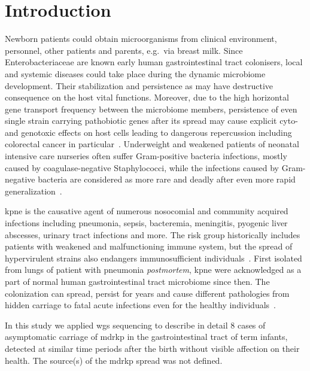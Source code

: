 \section{Introduction}\label{sec:intro}
Newborn patients could obtain microorganisms from clinical environment, personnel, other patients and parents,
e.g.\ via breast milk.
Since Enterobacteriaceae are known early human gastrointestinal tract colonisers, local and systemic diseases could take
place during the dynamic microbiome development.
Their stabilization and persistence as may have destructive consequence on the host vital functions.
Moreover, due to the high horizontal gene transport frequency between the microbiome members, persistence of even single
strain carrying pathobiotic genes after its spread may cause explicit cyto- and genotoxic effects on host cells
leading to dangerous repercussion including colorectal cancer in particular~\cite{Pope2019}.
Underweight and weakened patients of neonatal intensive care nurseries often suffer Gram-positive bacteria infections,
mostly caused by coagulase-negative Staphylococci, while the infections caused by Gram-negative bacteria are considered
as more rare and deadly after even more rapid generalization~\cite{Dorota2017}.

\gls{kpne} is the causative agent of numerous nosocomial and community acquired infections including
pneumonia, sepsis, bacteremia, meningitis, pyogenic liver abscesses, urinary tract infections and more.
The risk group historically includes patients with weakened and malfunctioning immune system, but the spread of
hypervirulent strains also endangers immunosufficient individuals~\cite{Shankar2018}.
First isolated from lungs of patient with pneumonia \textit{postmortem}, \gls{kpne} were acknowledged as a part of
normal human gastrointestinal tract microbiome since then.
The colonization can spread, persist for years and cause different pathologies from hidden carriage to
fatal acute infections even for the healthy individuals~\cite{Martin2018}.

In this study we applied \gls{wgs} sequencing to describe in detail 8 cases of asymptomatic carriage of \gls{mdrkp}
in the gastrointestinal tract of term infants, detected at similar time periods after the birth
without visible affection on their health.
The source(s) of the \gls{mdrkp} spread was not defined.
